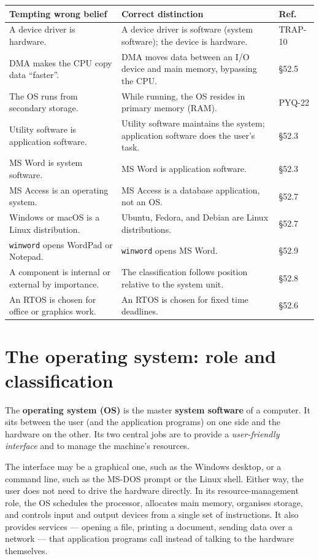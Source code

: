\documentclass[11pt]{article}
\begin{document}
\begin{center}
\begin{tabular}{p{}p{}p{}}
\toprule
\textbf{Tempting wrong belief} & \textbf{Correct distinction} & \textbf{Ref.} \\
\midrule
A device driver is hardware. & A device driver is software (system software); the device is hardware. & TRAP-10 \\
DMA makes the CPU copy data ``faster''. & DMA moves data between an I/O device and main memory, bypassing the CPU. & \S 52.5 \\
The OS runs from secondary storage. & While running, the OS resides in primary memory (RAM). & PYQ-22 \\
Utility software is application software. & Utility software maintains the system; application software does the user's task. & \S 52.3 \\
MS Word is system software. & MS Word is application software. & \S 52.3 \\
MS Access is an operating system. & MS Access is a database application, not an OS. & \S 52.7 \\
Windows or macOS is a Linux distribution. & Ubuntu, Fedora, and Debian are Linux distributions. & \S 52.7 \\
\texttt{winword} opens WordPad or Notepad. & \texttt{winword} opens MS Word. & \S 52.9 \\
A component is internal or external by importance. & The classification follows position relative to the system unit. & \S 52.8 \\
An RTOS is chosen for office or graphics work. & An RTOS is chosen for fixed time deadlines. & \S 52.6 \\
\bottomrule
\end{tabular}
\end{center}

\section{The operating system: role and classification}
The \textbf{operating system (OS)} is the master \textbf{system software} of a
computer. It sits between the user (and the application programs) on one side
and the hardware on the other. Its two central jobs are to provide a
\emph{user-friendly interface} and to manage the machine's resources.

The interface may be a graphical one, such as the Windows desktop, or a
command line, such as the MS-DOS prompt or the Linux shell. Either way, the
user does not need to drive the hardware directly. In its resource-management
role, the OS schedules the processor, allocates main memory, organises
storage, and controls input and output devices from a single set of
instructions. It also provides services --- opening a file, printing a
document, sending data over a network --- that application programs call
instead of talking to the hardware themselves.
\end{document}

